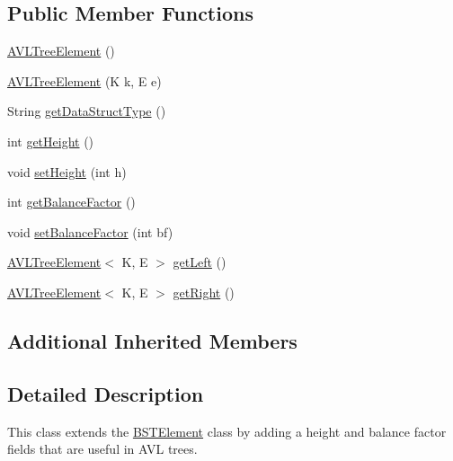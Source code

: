 \subsection*{Public Member Functions}
\begin{DoxyCompactItemize}
\item 
\mbox{\hyperlink{classbridges_1_1base_1_1_a_v_l_tree_element_a8fe4490d3d5d16991736bd1a7243b904}{A\+V\+L\+Tree\+Element}} ()
\item 
\mbox{\hyperlink{classbridges_1_1base_1_1_a_v_l_tree_element_a060ec94b52675313ad15388e3f292df5}{A\+V\+L\+Tree\+Element}} (K k, E e)
\item 
String \mbox{\hyperlink{classbridges_1_1base_1_1_a_v_l_tree_element_abdd9e63de10732ef46bd5d531bd7f9d8}{get\+Data\+Struct\+Type}} ()
\item 
int \mbox{\hyperlink{classbridges_1_1base_1_1_a_v_l_tree_element_a52fe2886334c841547d238db69022697}{get\+Height}} ()
\item 
void \mbox{\hyperlink{classbridges_1_1base_1_1_a_v_l_tree_element_ac42b744989ed7e18dcbd52980e674b33}{set\+Height}} (int h)
\item 
int \mbox{\hyperlink{classbridges_1_1base_1_1_a_v_l_tree_element_a0478ca0351cd714e8f7b8e49703990c8}{get\+Balance\+Factor}} ()
\item 
void \mbox{\hyperlink{classbridges_1_1base_1_1_a_v_l_tree_element_a0dc3c83e750cc39535afb08ea92f6c98}{set\+Balance\+Factor}} (int bf)
\item 
\mbox{\hyperlink{classbridges_1_1base_1_1_a_v_l_tree_element}{A\+V\+L\+Tree\+Element}}$<$ K, E $>$ \mbox{\hyperlink{classbridges_1_1base_1_1_a_v_l_tree_element_a86f1329b19d2886ba7bf713e3844ecd6}{get\+Left}} ()
\item 
\mbox{\hyperlink{classbridges_1_1base_1_1_a_v_l_tree_element}{A\+V\+L\+Tree\+Element}}$<$ K, E $>$ \mbox{\hyperlink{classbridges_1_1base_1_1_a_v_l_tree_element_aab93418ac19605f2c7c57aa38d110921}{get\+Right}} ()
\end{DoxyCompactItemize}
\subsection*{Additional Inherited Members}


\subsection{Detailed Description}
This class extends the \mbox{\hyperlink{classbridges_1_1base_1_1_b_s_t_element}{B\+S\+T\+Element}} class by adding a height and balance factor fields that are useful in A\+VL trees. 

